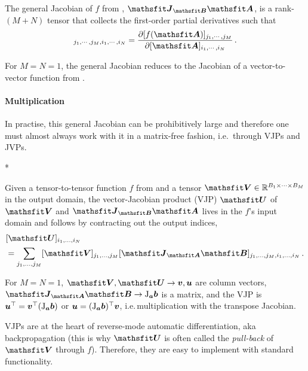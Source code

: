 \begin{definition}\label{def:general_jacobian}
  The general Jacobian of $f$ from , $\tJ_{\tB}\tA$, is a rank-$(M+N)$ tensor that collects the first-order partial derivatives such that
  \begin{align*}
    [\tJ_{\tA}\tB]_{j_1, \cdots ,j_M, i_1, \cdots, i_N} = \frac{\partial [f(\tA)]_{j_1, \cdots, j_M}}{\partial [\tA]_{i_1, \cdots, i_N}}\,.
  \end{align*}
\end{definition}
For $M=N=1$, the general Jacobian reduces to the Jacobian of a vector-to-vector function from .

\paragraph{Multiplication} In practise, this general Jacobian can be prohibitively large and therefore one must almost always work with it in a matrix-free fashion, i.e.\, through VJPs and JVPs.

\switchcolumn[1]*
\switchcolumn[0]

\begin{definition}\label{def:vjp}
  Given a tensor-to-tensor function $f$ from  and a tensor $\tV \in \sR^{B_1 \times \dots \times B_M}$ in the output domain, the vector-Jacobian product (VJP) $\tU$ of $\tV$ and $\tJ_{\tB}\tA$ lives in the $f$'s input domain and follows by contracting out the output indices,
  \begin{align*}
    &[\tU]_{i_1, \dots, i_N}
    \\
    &=
      \sum_{j_1, \dots, j_M}
      [\tV]_{j_1, \dots, j_M}
      [\tJ_{\tA}\tB]_{j_1, \dots, j_M, i_1, \dots, i_N}\,.
  \end{align*}
\end{definition}
For $M=N=1$, $\tV, \tU \to \vv, \vu$ are column vectors, $\tJ_{\tA}\tB \to \jac_{\va}\vb$ is a matrix, and the VJP is ${\bm{u}}^{\top} = {\bm{v}}^{\top} (\mathrm{J}_{{\bm{a}}}{\bm{b}})$ or ${\bm{u}} = (\mathrm{J}_{{\bm{a}}}{\bm{b}})^{\top} {\bm{v}}$, i.e.\,multiplication with the transpose Jacobian.

VJPs are at the heart of reverse-mode automatic differentiation, aka backpropagation (this is why $\tU$ is often called the \emph{pull-back} of $\tV$ through $f$).
Therefore, they are easy to implement with standard functionality.

